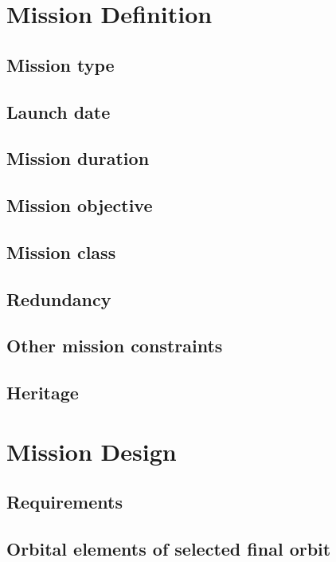 \section{Mission Definition} 
\subsection{Mission type}

\subsection{Launch date}

\subsection{Mission duration}

\subsection{Mission objective}

\subsection{Mission class}

\subsection{Redundancy}

\subsection{Other mission constraints}

\subsection{Heritage}

\section{Mission Design} 

\subsection{Requirements}

\subsection{Orbital elements of selected final orbit}

